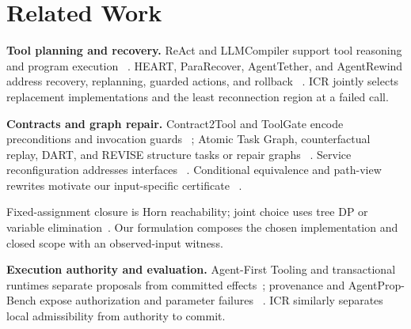 \section{Related Work}
\textbf{Tool planning and recovery.}
ReAct and LLMCompiler support tool reasoning and program execution
~\cite{react,llmcompiler}. HEART, ParaRecover, AgentTether, and AgentRewind
address recovery, replanning, guarded actions, and rollback
~\cite{heart,pararecover,agenttether,agentrewind}. ICR jointly selects
replacement implementations and the least reconnection region at a failed call.

\textbf{Contracts and graph repair.}
Contract2Tool and ToolGate encode preconditions and invocation guards
~\cite{contract2tool,toolgate_published}; Atomic Task Graph, counterfactual
replay, DART, and REVISE structure tasks or repair graphs
~\cite{atg,gcjr,dart,revise}. Service reconfiguration addresses interfaces
~\cite{servicereconfiguration}. Conditional equivalence and path-view rewrites
motivate our input-specific certificate
~\cite{kawaguchi2010conditional,romero2020pathviews}.

Fixed-assignment closure is Horn reachability; joint choice uses tree DP or
variable elimination~\cite{dechter1999bucket}. Our formulation composes the
chosen implementation and closed scope with an observed-input witness.

\textbf{Execution authority and evaluation.}
Agent-First Tooling and transactional runtimes separate proposals from
committed effects~\cite{aft,cordon,mnemosyne2026}; provenance and
AgentProp-Bench expose authorization and parameter failures
~\cite{pactprovenance,agentprop}. ICR similarly separates local admissibility
from authority to commit.
